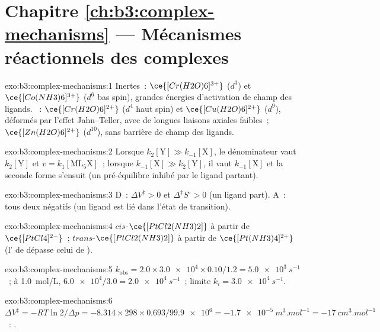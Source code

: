 \section*{Chapitre \ref{ch:b3:complex-mechanisms} --- Mécanismes réactionnels des complexes}

\begin{solution}{exo:b3:complex-mechanisms:1}
Inertes~: $\ce{[Cr(H2O)6]^{3+}}$ ($d^3$) et $\ce{[Co(NH3)6]^{3+}}$ ($d^6$ bas spin), grandes énergies
d'activation de champ des ligands. ~: $\ce{[Cr(H2O)6]^{2+}}$ ($d^4$ haut spin) et $\ce{[Cu(H2O)6]^{2+}}$ ($d^9$),
déformés par l'effet Jahn--Teller, avec de longues liaisons axiales
faibles~; $\ce{[Zn(H2O)6]^{2+}}$ ($d^{10}$), sans barrière de champ des
ligands.
\end{solution}

\begin{solution}{exo:b3:complex-mechanisms:2}
Lorsque $k_2[\mathrm Y] \gg k_{-1}[\mathrm X]$, le dénominateur vaut $k_2[\mathrm Y]$ et $v = k_1[\mathrm{ML_5X}]$~; lorsque $k_{-1}[\mathrm X] \gg k_2[\mathrm Y]$, il vaut
$k_{-1}[\mathrm X]$ et la seconde forme s'ensuit (un pré-équilibre inhibé
par le ligand partant).
\end{solution}

\begin{solution}{exo:b3:complex-mechanisms:3}
D~: $\Delta V^{\ddagger} > 0$ et $\Delta^{\ddagger}S^\circ > 0$ (un ligand part). A~: tous deux négatifs (un
ligand est lié dans l'état de transition).
\end{solution}

\begin{solution}{exo:b3:complex-mechanisms:4}
$cis$-$\ce{[PtCl2(NH3)2]}$ à partir de $\ce{[PtCl4]^{2-}}$~; $trans$-$\ce{[PtCl2(NH3)2]}$ à partir de $\ce{[Pt(NH3)4]^{2+}}$
(l' de  dépasse celui de ).
\end{solution}

\begin{solution}{exo:b3:complex-mechanisms:5}
$k_{\mathrm{obs}} = 2.0 \times \num{3.0e4} \times 0.10/1.2 = \qty{5.0e3}{s^{-1}}$~; à \qty{1.0}{mol/L}, $\num{6.0e4}/3.0 = \qty{2.0e4}{s^{-1}}$~; limite
$k_i = \qty{3.0e4}{s^{-1}}$.
\end{solution}

\begin{solution}{exo:b3:complex-mechanisms:6}
$\Delta V^{\ddagger} = -RT\ln2/\Delta p = -8.314 \times 298 \times 0.693/\num{99.9e6} = \qty{-1.7e-5}{m^3.mol^{-1}} = \qty{-17}{cm^3.mol^{-1}}$~:
.
\end{solution}

